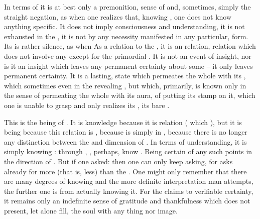 In terms of  it is at best only a  premonition,
 sense of  and, sometimes, simply the straight
negation, as when one realizes that, knowing , one does not
 know anything specific. 
It does not imply  consciousness and understanding, it is not
exhausted in the , it is not by any necessity manifested in any
particular,  form.  Its  is rather silence, as when
 As a
relation to the , it is an  relation, relation which
does not involve any  except for the primordial
.
It is not an event of insight, nor is it an insight which leaves any permanent
certainty about some  -- it only leaves permanent certainty. It is a
lasting,  state which permeates the whole  with its
, which sometimes even  in the revealing ,
but which, primarily, is known only in the sense of permeating the whole
 with its aura, of putting its  stamp on it, which
one is unable to grasp and only realizes its , its bare .

\pa
This  is the being of . It is knowledge
because it is relation ( which ), but it
is being because this relation is , because  is
simply  in , because there is no longer any
distinction between the  and  dimension of
.  In terms of  understanding, it is simply knowing
:    through , , perhaps,   know .
Being  
certain of any such  points in the direction of \Yes. But if one asked:
 then one can only keep asking, 
for  asks already for more (that is, less) than the . One might only remember that there are many degrees of knowing
 and the more definite interpretation man attempts, the further
one is from actually knowing it.  For the  claims to verifiable
certainty, it remains only an indefinite sense of gratitude and thankfulness 
which does not present, let alone fill, the soul with any thing nor image.


